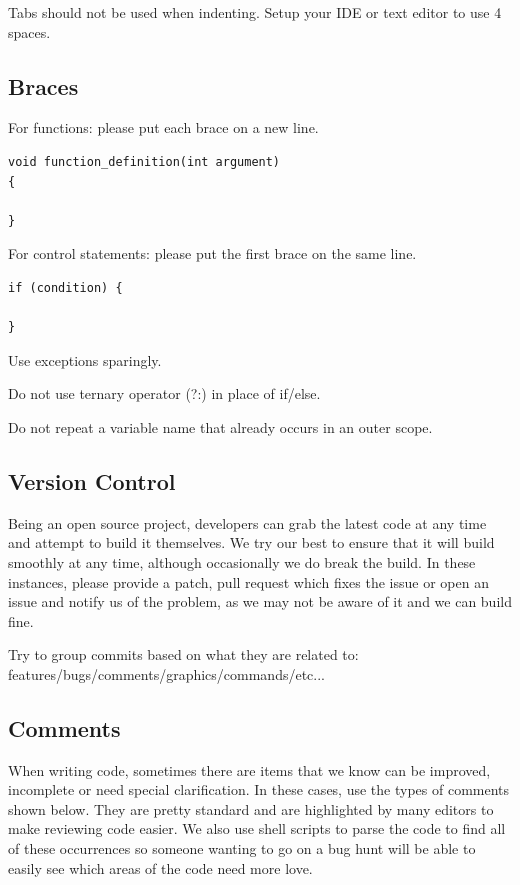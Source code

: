 \documentclass{report}
\begin{document}
Tabs should not be used when indenting. Setup your IDE or text editor to
use 4 spaces.

\subsection{Braces}

For functions: please put each brace on a new line.

\begin{verbatim}
void function_definition(int argument)
{

}
\end{verbatim}

For control statements: please put the first brace on the same line.

\begin{verbatim}
if (condition) {

}
\end{verbatim}

Use exceptions sparingly.

Do not use ternary operator (?:) in place of if/else.

Do not repeat a variable name that already occurs in an outer scope.

\subsection{Version Control}

Being an open source project, developers can grab the latest code at any
time and attempt to build it themselves. We try our best to ensure that
it will build smoothly at any time, although occasionally we do break
the build. In these instances, please provide a patch, pull request
which fixes the issue or open an issue and notify us of the problem, as
we may not be aware of it and we can build fine.

Try to group commits based on what they are related to:
features/bugs/comments/graphics/commands/etc...

\subsection{Comments}

When writing code, sometimes there are items that we know can be
improved, incomplete or need special clarification. In these cases, use
the types of comments shown below. They are pretty standard and are
highlighted by many editors to make reviewing code easier. We also use
shell scripts to parse the code to find all of these occurrences so
someone wanting to go on a bug hunt will be able to easily see which
areas of the code need more love.
\end{document}
